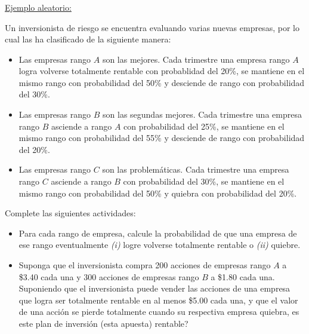 \documentclass[ 10pt, xcolor = dvipsnames]{beamer}
\begin{document}
\begin{frame}[allowframebreaks]
\frametitle{\insertsubsection}

\underline{Ejemplo aleatorio:}

Un inversionista de riesgo se encuentra evaluando varias nuevas empresas, \linebreak por lo cual las ha clasificado de la siguiente manera: 
\begin{itemize}
\item Las empresas rango $A$ son las mejores. Cada trimestre una empresa rango $A$ logra volverse totalmente rentable con probablidad del 20\%, se mantiene en el mismo rango con probabilidad del 50\% y desciende de rango con probabilidad del 30\%. 
\item Las empresas rango $B$ son las segundas mejores. Cada trimestre una empresa rango $B$ asciende a rango $A$ con probabilidad del 25\%, se mantiene en el mismo rango con probabilidad del 55\% y desciende de rango con probabilidad del 20\%. 
\item Las empresas rango $C$ son las problem\'aticas. Cada trimestre una empresa rango $C$ asciende a rango $B$ con probabilidad del 30\%, se mantiene en el mismo rango con probabilidad del 50\% y quiebra con probabilidad del 20\%. 
\end{itemize}
\framebreak

\begin{figure}[htb]
\centering
\def\svgwidth{0.98\columnwidth}

\end{figure}
\framebreak

Complete las siguientes actividades: 
\begin{itemize}
\item Para cada rango de empresa, calcule la probabilidad de que una empresa de ese rango eventualmente \textit{(i)} logre volverse totalmente rentable o \textit{(ii)} quiebre. 
\item Suponga que el inversionista compra 200 acciones de empresas rango $A$ a \$3.40 cada una y 300 acciones de empresas rango $B$ a \$1.80 cada una. Suponiendo que el inversionista puede vender las acciones de una empresa que logra ser totalmente rentable en al menos \$5.00 cada una, y que el valor de una acci\'on se pierde totalmente cuando su respectiva empresa quiebra, es este plan de inversi\'on (\ie esta apuesta) rentable?
\end{itemize}

\end{frame}
\end{document}

